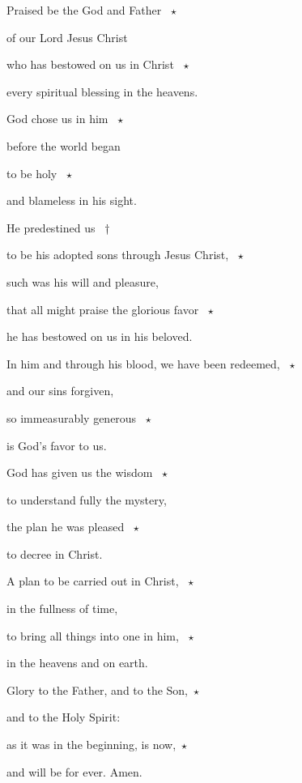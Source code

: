 \noindent Praised be the God and Father ~$\star$~\nopagebreak

of our Lord Jesus Christ

\noindent who has bestowed on us in Christ ~$\star$~\nopagebreak

every spiritual blessing in the heavens.

\noindent God chose us in him ~$\star$~\nopagebreak

before the world began

\noindent to be holy ~$\star$~\nopagebreak

and blameless in his sight.

\noindent He predestined us ~†~\nopagebreak

to be his adopted sons through Jesus Christ, ~$\star$~\nopagebreak

such was his will and pleasure,

\noindent that all might praise the glorious favor ~$\star$~\nopagebreak

he has bestowed on us in his beloved.

\noindent In him and through his blood, we have been redeemed, ~$\star$~\nopagebreak

and our sins forgiven,

\noindent so immeasurably generous ~$\star$~\nopagebreak

is God’s favor to us.

\noindent God has given us the wisdom ~$\star$~\nopagebreak

to understand fully the mystery,

\noindent the plan he was pleased ~$\star$~\nopagebreak

to decree in Christ.

\noindent A plan to be carried out in Christ, ~$\star$~\nopagebreak

in the fullness of time,

\noindent to bring all things into one in him, ~$\star$~\nopagebreak

in the heavens and on earth.

\noindent Glory to the Father, and to the Son,~$\star$~\nopagebreak

and to the Holy Spirit:

\noindent as it was in the beginning, is now,~$\star$~\nopagebreak

and will be for ever. Amen.
